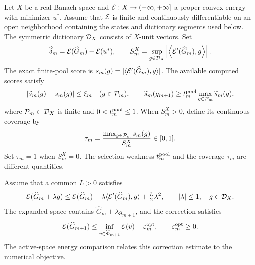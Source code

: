\documentclass[11pt]{article}
\theoremstyle{remark}
\begin{document}
Let \(X\) be a real Banach space and \(\mathcal E:X\to(-\infty,+\infty]\) a proper convex energy with minimizer \(u^*\). Assume that \(\mathcal E\) is finite and continuously differentiable on an open neighborhood containing the states and dictionary segments used below.
The symmetric dictionary $\mathcal D_X$ consists of $X$-unit vectors. Set
\[
 \widehat\delta_m=\mathcal E(\widehat G_m)-\mathcal E(u^*),\qquad
 S_m^X=\sup_{g\in\mathcal D_X}\left|\left\langle\mathcal E'(\widehat G_m),g\right\rangle\right|.
\]
The exact finite-pool score is $s_m(g)=|\langle\mathcal E'(\widehat G_m),g\rangle|$.
The available computed scores satisfy
\begin{equation}
 \left|\widetilde s_m(g)-s_m(g)\right|\leq\xi_m\quad(g\in\mathcal P_m),\qquad
 \widetilde s_m(g_{m+1})\geq t_m^{\rm pool}
                  \max_{g\in\mathcal P_m}\widetilde s_m(g),
 \label{eq:c5-oracle}
\end{equation}
where $\mathcal P_m\subset\mathcal D_X$ is finite and $0<t_m^{\rm pool}\leq1$.
When $S_m^X>0$, define its continuous coverage by
\begin{equation}
 \tau_m=\frac{\max_{g\in\mathcal P_m}s_m(g)}{S_m^X}\in[0,1].
 \label{eq:c5-coverage}
\end{equation}
Set $\tau_m=1$ when $S_m^X=0$. The selection weakness $t_m^{\rm pool}$
and the coverage $\tau_m$ are different quantities.

Assume that a common $L>0$ satisfies
\begin{equation}
 \mathcal E(\widehat G_m+\lambda g)
 \leq\mathcal E(\widehat G_m)+\lambda\langle\mathcal E'(\widehat G_m),g\rangle
            +\tfrac L2\lambda^2,\qquad |\lambda|\leq1,\quad g\in\mathcal D_X.
 \label{eq:c5-directional}
\end{equation}
The expanded space contains $\widehat G_m+\lambda g_{m+1}$, and the
correction satisfies
\begin{equation}
 \mathcal E(\widehat G_{m+1})\leq
 \inf_{v\in\widehat\Phi_{m+1}}\mathcal E(v)+\varepsilon_m^{\rm opt},
 \qquad \varepsilon_m^{\rm opt}\geq0 .
 \label{eq:c5-correction}
\end{equation}
The active-space energy comparison relates this correction estimate to the numerical objective.
\end{document}
